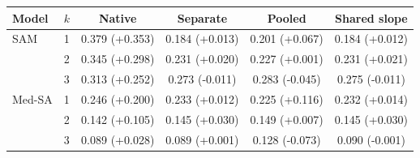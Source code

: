 \begin{tabular}{llcccc}
\toprule
Model & $k$ & Native & Separate & Pooled & Shared slope \\
\midrule
SAM & 1 & 0.379 (+0.353) & 0.184 (+0.013) & 0.201 (+0.067) & 0.184 (+0.012) \\
 & 2 & 0.345 (+0.298) & 0.231 (+0.020) & 0.227 (+0.001) & 0.231 (+0.021) \\
 & 3 & 0.313 (+0.252) & 0.273 (-0.011) & 0.283 (-0.045) & 0.275 (-0.011) \\
\midrule
Med-SA & 1 & 0.246 (+0.200) & 0.233 (+0.012) & 0.225 (+0.116) & 0.232 (+0.014) \\
 & 2 & 0.142 (+0.105) & 0.145 (+0.030) & 0.149 (+0.007) & 0.145 (+0.030) \\
 & 3 & 0.089 (+0.028) & 0.089 (+0.001) & 0.128 (-0.073) & 0.090 (-0.001) \\
\bottomrule
\end{tabular}
